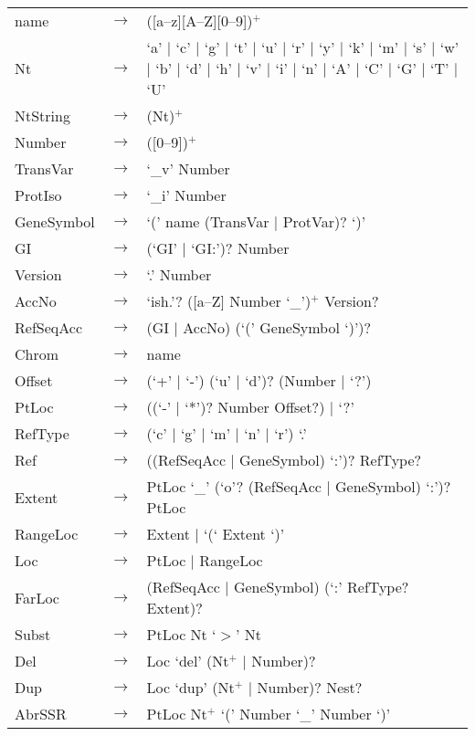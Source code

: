 \begin{longtable}{llp{7cm}}
name     & $\rightarrow$ & ([a--z][A--Z][0--9])$^+$\\
Nt       & $\rightarrow$ & `a' $|$ `c' $|$ `g' $|$ `t' $|$ `u' $|$ `r' $|$ 
                           `y' $|$ `k' $|$ `m' $|$ `s' $|$ `w' $|$ `b' $|$ 
                           `d' $|$ `h' $|$ `v' $|$ `i' $|$ `n' $|$ `A' $|$ 
                           `C' $|$ `G' $|$ `T' $|$ `U'\\
NtString & $\rightarrow$ & (Nt)$^+$\\
Number & $\rightarrow$ & ([0--9])$^+$\\
TransVar   & $\rightarrow$ & `\_v' Number\\
ProtIso    & $\rightarrow$ & `\_i' Number\\
GeneSymbol & $\rightarrow$ & `(' name (TransVar $|$ ProtVar)? `)'\\
GI         & $\rightarrow$ & (`GI' $|$ `GI:')? Number\\
Version    & $\rightarrow$ & `.' Number\\
AccNo      & $\rightarrow$ & `ish.'? ([a--Z] Number `\_')$^+$ Version? \\
RefSeqAcc  & $\rightarrow$ & (GI $|$ AccNo) (`(' GeneSymbol `)')?\\
Chrom & $\rightarrow$ & name\\
Offset & $\rightarrow$ & (`+' $|$ `-') (`u' $|$ `d')? (Number $|$ `?')\\
PtLoc & $\rightarrow$ & ((`-' $|$ `*')? Number Offset?) $|$ `?'\\
RefType & $\rightarrow$ & (`c' $|$ `g' $|$ `m' $|$ `n' $|$ `r') `.'\\
Ref & $\rightarrow$ & ((RefSeqAcc $|$ GeneSymbol) `:')? RefType?\\
Extent & $\rightarrow$ & PtLoc `\_' (`o'? (RefSeqAcc $|$ GeneSymbol) `:')? PtLoc\\
RangeLoc & $\rightarrow$ & Extent $|$ `(` Extent `)'\\
Loc & $\rightarrow$ & PtLoc $|$ RangeLoc\\
FarLoc & $\rightarrow$ & (RefSeqAcc $|$ GeneSymbol) (`:' RefType? Extent)? \\
Subst & $\rightarrow$ & PtLoc Nt `$>$' Nt\\
Del & $\rightarrow$ & Loc `del' (Nt$^+$ $|$ Number)?\\
Dup & $\rightarrow$ & Loc `dup' (Nt$^+$ $|$ Number)? Nest?\\
AbrSSR & $\rightarrow$ & PtLoc  Nt$^+$ `(' Number `\_' Number `)'\\

\end{longtable}
